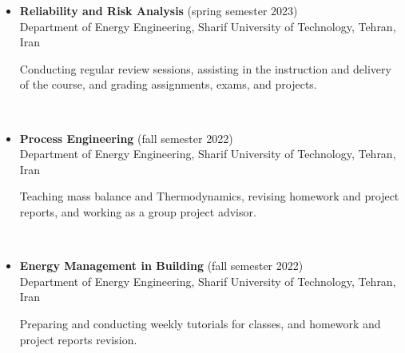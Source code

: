 \documentclass[letter,20pt]{article}
\begin{document}
\begin{itemize}[noitemsep, topsep=6pt, after=\vspace{-0.5 mm},leftmargin = 0ex,rightmargin=1ex]
	
	\small \item[]  \textbf {Reliability and Risk Analysis} (spring semester 2023)\\
    \indent\hspace{1cm}Department of Energy Engineering, Sharif University of Technology, Tehran, Iran \\
    \indent\hspace{1cm}\parbox{17cm}{Conducting regular review sessions, assisting in the instruction and delivery of the course, and grading assignments, exams, and projects.}

        {\noindent{}}\\\vspace{5pt}

    \small \item[]  \textbf {Process Engineering} (fall semester 2022)\\
    \indent\hspace{1cm}Department of Energy Engineering, Sharif University of Technology, Tehran, Iran \\
    \indent\hspace{1cm}\parbox{17cm}{Teaching mass balance and Thermodynamics, revising homework and project reports, and working as a group project advisor.}

        {\noindent{}}\\\vspace{5pt}

    \small \item[]  \textbf {Energy Management in Building} (fall semester 2022)\\
    \indent\hspace{1cm}Department of Energy Engineering, Sharif University of Technology, Tehran, Iran \\
    \indent\hspace{1cm}\parbox{17cm}{ Preparing and conducting weekly tutorials for classes, and homework and project reports revision.}

        {\noindent{}}\\\vspace{5pt}
\end{itemize}
\end{document}
